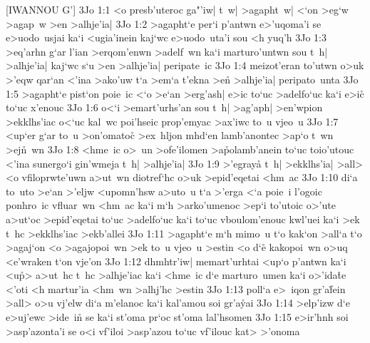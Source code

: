 [IWANNOU G']
\vs 3Jo 1:1
<o
presb'uteroc
ga"'iw|
t~w|
>agapht~w|
<`on
>eg`w
>agap~w
>en
>alhje'ia|\bibvsend
\vs 3Jo 1:2
>agapht`e
per`i
p'antwn
e>'uqoma'i
se
e>uodo~usjai
ka`i
<ugia'inein
kaj`wc
e>uodo~uta'i
sou
<h
yuq'h\bibvsend
\vs 3Jo 1:3
>eq'arhn
g`ar
l'ian
>erqom'enwn
>adelf~wn
ka`i
marturo'untwn
sou
t~h|
>alhje'ia|
kaj`wc
s`u
>en
>alhje'ia|
peripate~ic\bibvsend
\vs 3Jo 1:4
meizot'eran
to'utwn
o>uk
>'eqw
qar`an
<'ina
>ako'uw
t`a
>em`a
t'ekna
>e\r{n}
>alhje'ia|
peripato~unta\bibvsend
\vs 3Jo 1:5
>agapht`e
pist`on
poie~ic
<`o
>e`an
>erg'ash|
e>ic
to`uc
>adelfo`uc
ka`i
e>ic\r{}
to`uc
x'enouc\bibvsend
\vs 3Jo 1:6
o<`i
>emart'urhs'an
sou
t~h|
>ag'aph|
>en'wpion
>ekklhs'iac
o<`uc
kal~wc
poi'hseic
prop'emyac
>ax'iwc
to~u
vjeo~u\bibvsend
\vs 3Jo 1:7
<up`er
g`ar
to~u
>on'omato\r{c}
>ex~hljon
mhd`en
lamb'anontec
>ap`o
t~wn
>ej\r{n}~wn\bibvsend
{}
\vs 3Jo 1:8
<hme~ic
o>~un
>ofe'ilomen
>a\r{p}olamb'anein
to`uc
toio'utouc
<'ina
sunergo`i
gin'wmeja
t~h|
>alhje'ia|\bibvsend
\vs 3Jo 1:9
>'egray\r{a}
t~h|
>ekklhs'ia|
>all>
<o
vfiloprwte'uwn
a>ut~wn
diotref`hc
o>uk
>epid'eqetai
<hm~ac\bibvsend
\vs 3Jo 1:10
di`a
to~uto
>e`an
>'eljw
<upomn'hsw
a>uto~u
t`a
>'erga
<`a
poie~i
l'ogoic
ponhro~ic
vfluar~wn
<hm~ac
ka`i
m`h
>arko'umenoc
>ep`i
to'utoic
o>'ute
a>ut`oc
>epid'eqetai
to`uc
>adelfo`uc
ka`i
to`uc
vboulom'enouc
kwl'uei
ka`i
>ek
t~hc
>ekklhs'iac
>ekb'allei\bibvsend
\vs 3Jo 1:11
>agapht`e
m`h
mimo~u
t`o
kak`on
>all`a
t`o
>agaj`on
<o
>agajopoi~wn
>ek
to~u
vjeo~u
>estin
<o
d`e\r{}
kakopoi~wn
o>uq
<e'wraken
t`on
vje'on\bibvsend
\vs 3Jo 1:12
dhmhtr'iw|
memart'urhtai
<up`o
p'antwn
ka`i
<u\r{p}>
a>ut~hc
t~hc
>alhje'iac
ka`i
<hme~ic
d`e
marturo~umen
ka`i
o>'ida\r{t}e
<'oti
<h
martur'ia
<hm~wn
>alhj'hc
>estin\bibvsend
\vs 3Jo 1:13
poll`a
e>~iqon
gr'a\r{f}ein
>all>
o>u
vj'elw
di`a
m'elanoc
ka`i
kal'amou
soi
gr'a\r{y}ai\bibvsend
{}
\vs 3Jo 1:14
>elp'izw
d`e
e>uj'ewc
>ide~in\r{}
se
ka`i
st'oma
pr`oc
st'oma
lal'hsomen\bibvsend
\vs 3Jo 1:15
e>ir'hnh
soi
>asp'azonta'i
se
o<i
vf'iloi
>asp'azou
to`uc
vf'ilouc
kat>
>'onoma\bibvsend
